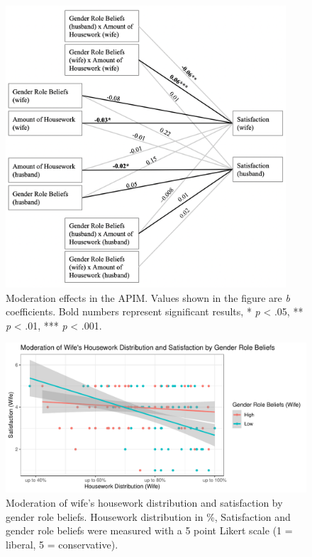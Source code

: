 \documentclass[
  man,floatsintext]{apa6}
\begin{document}
\begin{figure}
\includegraphics[width=4.11in]{moderation} \caption{Moderation effects in the APIM. Values shown in the figure are \emph{b} coefficients. Bold numbers represent significant results, * \emph{p} \textless{} .05, ** \emph{p} \textless{} .01, *** \emph{p} \textless{} .001.}\label{fig:unnamed-chunk-54}
\end{figure}



\begin{figure}
\centering
\includegraphics{Final_Paper_files/figure-latex/unnamed-chunk-57-1.pdf}
\caption{\label{fig:unnamed-chunk-57}Moderation of wife's housework distribution and satisfaction by gender role beliefs. Housework distribution in \%, Satisfaction and gender role beliefs were measured with a 5 point Likert scale (1 = liberal, 5 = conservative).}
\end{figure}
\end{document}
